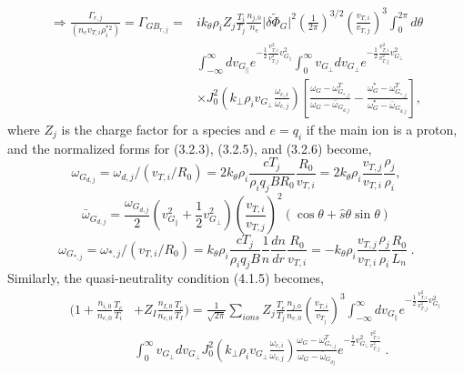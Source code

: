 \documentclass[12pt]{article}
\numberwithin{equation}{subsection}
\begin{document}
   \begin{equation}
   \begin{aligned}
      \Rightarrow    \frac{\Gamma_{r,j}}{(n_ev_{T,i}\rho_i^{*2})} = \Gamma_{GB_{r,j}} =
                    &ik_\theta\rho_iZ_j\frac{T_i}{T_j}\frac{n_{j,0}}{n_e}\lvert\delta\widetilde{\Phi}_G\rvert^2
                     \left(\frac{1}{2\pi}\right)^{3/2}\left(\frac{v_{T,i}}{v_{T,j}}\right)^3\int_{0}^{2\pi}d\theta \\
                    &\int_{-\infty}^{\infty}dv_{G_\parallel}e^{-\frac{1}{2}\frac{v_{T,i}^2}{v_{T,j}^2}{v_{G_\parallel}^2}}
                     \int_{0}^{\infty}v_{G_\perp}dv_{G_\perp}e^{-\frac{1}{2}\frac{v_{T,i}^2}{v_{T,j}^2}v_{G_\perp}^2} \\
                    &\times J_0^2(k_\perp\rho_iv_{G_\perp}\frac{\omega_{c,i}}{\omega_{c,j}})
                     [\frac{\omega_G-\omega^T_{G_{*,j}}}{\omega_G-\bar{\omega}_{G_{d,j}}}
                     - \frac{\omega_G^*-\omega^T_{G_{*,j}}}{\omega_G^*-\bar{\omega}_{G_{d,j}}}],
   \end{aligned}
   \end{equation}
where $Z_j$ is the charge factor for a species and $e=q_i$ if the main ion is a proton, and the normalized forms for (3.2.3), (3.2.5), and (3.2.6) become,
   \begin{equation}
      \omega_{G_{d,j}} = \omega_{d,j}/(v_{T,i}/R_0) = 2k_\theta\rho_i\frac{cT_j}{\rho_iq_jBR_0}\frac{R_0}{v_{T,i}} =
                         2k_\theta\rho_i\frac{v_{T,j}}{v_{T,i}}\frac{\rho_j}{\rho_i},
   \end{equation}
   \begin{equation}
      \bar{\omega}_{G_{d,j}} = \frac{\omega_{G_{d,j}}}{2}(v_{G_\parallel}^2 + \frac{1}{2}v_{G_\perp}^2)
                               \left(\frac{v_{T,i}}{v_{T,j}}\right)^2(\cos\theta + \hat{s}\theta\sin\theta)
   \end{equation}
   \begin{equation}
      \omega_{G_{*,j}} = \omega_{*,j}/(v_{T,i}/R_0) = k_\theta\rho_i\frac{cT_j}{\rho_iq_jB}\frac{1}{n}\frac{dn}{dr}\frac{R_0}{v_{T,i}}
                       = -k_\theta\rho_i\frac{v_{T,j}}{v_{T,i}}\frac{\rho_j}{\rho_i}\frac{R_0}{L_n}\;.
   \end{equation}
Similarly, the quasi-neutrality condition (4.1.5) becomes,
   \begin{equation}
   \begin{aligned}
       \quad\quad\quad(1 + \frac{n_{i,0}}{n_{e,0}}\frac{T_e}{T_i} 
      &+ Z_I\frac{n_{I,0}}{n_{e,0}}\frac{T_e}{T_I}) =
       \frac{1}{\sqrt{2\pi}}\sum\limits_{ions}Z_j\frac{T_e}{T_j}\frac{n_{j,0}}{n_{e,0}}\left(\frac{v_{T,i}}{v_{T_j}}\right)^{3}
       \int_{-\infty}^{\infty}dv_{G_\parallel}e^{-\frac{1}{2}\frac{v^2_{T,i}}{v^2_{T,j}}v_{G_\parallel}^2} \\
      &\int_{0}^{\infty}v_{G_\perp} dv_{G_\perp} J_0^2(k_\perp\rho_i v_{G_\perp}\frac{\omega_{c,i}}{\omega_{c,j}})
       \frac{\omega_G - \omega_{G_{*,j}}^T}{\omega_G - \bar{\omega}_{G_{dj}}}e^{-\frac{1}{2}v_{G_\perp}^2\frac{v_{T,i}^2}{v_{T,j}^2}}\;.
   \end{aligned}
   \end{equation}
\end{document}
